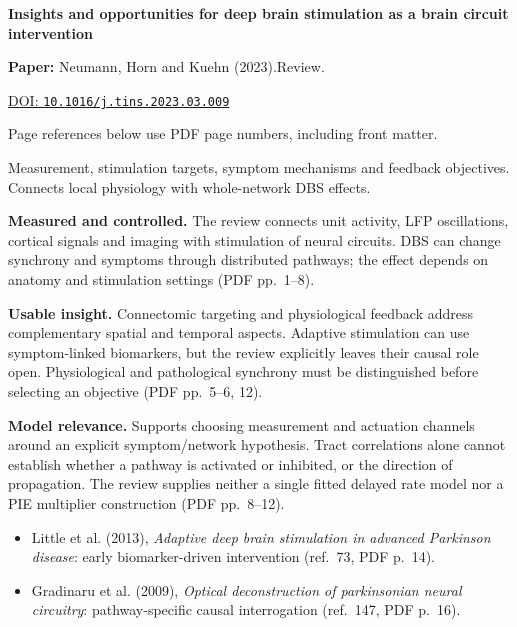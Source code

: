 

{\Large\bfseries Insights and opportunities for deep brain stimulation as a brain circuit intervention\par}

\textbf{Paper:} Neumann, Horn and Kuehn (2023).\quad Review.\par
\href{https://doi.org/10.1016/j.tins.2023.03.009}{DOI: \nolinkurl{10.1016/j.tins.2023.03.009}}\par
{\footnotesize Page references below use PDF page numbers, including front matter.}

Measurement, stimulation targets, symptom mechanisms and feedback objectives. Connects local physiology with whole-network DBS effects.

\textbf{Measured and controlled.} The review connects unit activity, LFP oscillations, cortical signals and imaging with stimulation of neural circuits. DBS can change synchrony and symptoms through distributed pathways; the effect depends on anatomy and stimulation settings (PDF pp.~1--8).

\textbf{Usable insight.} Connectomic targeting and physiological feedback address complementary spatial and temporal aspects. Adaptive stimulation can use symptom-linked biomarkers, but the review explicitly leaves their causal role open. Physiological and pathological synchrony must be distinguished before selecting an objective (PDF pp.~5--6, 12).

\textbf{Model relevance.} Supports choosing measurement and actuation channels around an explicit symptom/network hypothesis. Tract correlations alone cannot establish whether a pathway is activated or inhibited, or the direction of propagation. The review supplies neither a single fitted delayed rate model nor a PIE multiplier construction (PDF pp.~8--12).

\begin{itemize}
\item Little et al. (2013), \emph{Adaptive deep brain stimulation in advanced Parkinson disease}: early biomarker-driven intervention (ref.~73, PDF p.~14).
\item Gradinaru et al. (2009), \emph{Optical deconstruction of parkinsonian neural circuitry}: pathway-specific causal interrogation (ref.~147, PDF p.~16).
\end{itemize}



